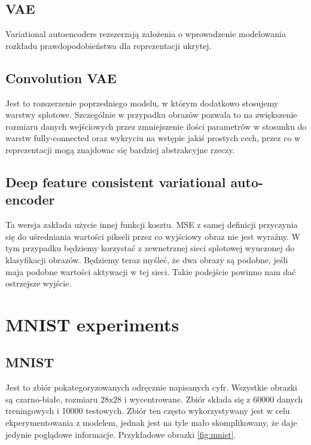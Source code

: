 \documentclass[polish,inz,shortabstract, declaration]{iithesis}
\begin{document}
\section{VAE}

Variational autoencoders rezszerzają założenia o wprowadzenie modelowania rozkładu prawdopodobieństwa dla reprezentacji ukrytej. 

\section{Convolution VAE}

Jest to rozszerzenie poprzedniego modelu, w którym dodatkowo stosujemy warstwy splotowe. Szczególnie w przypadku obrazów pozwala to na zwiększenie rozmiaru danych wejściowych przez zmniejszenie ilości parametrów w stosunku do warstw fully-connected oraz wykryciu na wstępie jakiś prostych cech, przez co w reprezentacji mogą znajdowac się bardziej abstrakcyjne rzeczy. 

\section{Deep feature consistent variational auto-encoder}

Ta wersja zakłada użycie innej funkcji kosztu. MSE z samej definicji przyczynia się do uśredniania wartości pikseli przez co wyjściowy obraz nie jest wyraźny. W tym przypadku będziemy korzystać z zewnetrznej sieci splotowej wyuczonej do klasyfikacji obrazów. Będziemy teraz myśleć, że dwa obrazy są podobne, jeśli maja podobne wartości aktywacji w tej sieci. Takie podejście powinno nam dać ostrzejsze wyjście.

\chapter{MNIST experiments}

\section{MNIST}

Jest to zbiór pokategoryzowanych odręcznie napisanych cyfr. Wszystkie obrazki są czarno-białe, rozmiaru 28x28 i wycentrowane. Zbiór składa się z 60000 danych treningowych i 10000 testowych. Zbiór ten często wykorzystywany jest w celu ekperymentowania z modelem, jednak jest na tyle mało skomplikowany, że daje jedynie poglądowe informacje. Przykładowe obrazki \ref{fig:mnist}.
\end{document}
